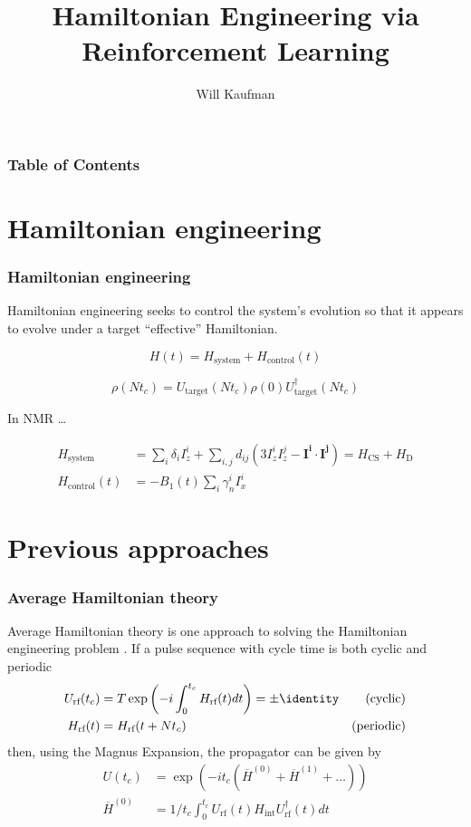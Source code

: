 \documentclass{beamer}
\title{Hamiltonian Engineering via Reinforcement Learning}
\author{Will Kaufman}
\institute{Ramanathan Group \\ Dartmouth College}
\begin{document}
\frame{\titlepage}

\begin{frame}
\frametitle{Table of Contents}
\tableofcontents
\end{frame}

\section{Hamiltonian engineering}

\begin{frame}
\frametitle{Hamiltonian engineering}

Hamiltonian engineering seeks to control the system's evolution so that it appears to evolve under a target ``effective'' Hamiltonian.

\begin{equation}
    H(t) = H_\text{system} + H_\text{control}(t)
\end{equation}

\begin{equation}\label{eq:strob_measure}
    \rho(Nt_c) = U_\text{target}(Nt_c) \rho(0) U_\text{target}^\dagger(Nt_c)
\end{equation}

\pause

In NMR \cite{1976ii}\dots

\begin{align}\label{eq:ham_spin}
    H_\text{system} &= \sum_i \delta_i I_z^i + \sum_{i,j} d_{ij} \left( 3I_z^iI_z^j - \mathbf{I^i} \cdot \mathbf{I^j} \right)
    = H_\text{CS} + H_\text{D} \\
    H_\text{control}(t) &= -B_1(t) \sum_i \gamma_n^i I_x^i
\end{align}

\end{frame}

\section{Previous approaches}

\begin{frame}
\frametitle{Average Hamiltonian theory}

Average Hamiltonian theory is one approach to solving the Hamiltonian engineering problem
\cite{PhysRev.175.453}.
If a pulse sequence with cycle time is both cyclic and periodic
\cite{gerstein-dybowski}
\begin{align}\label{eq:AHT_conditions}
    U_\text{rf}(t_c) &= T\exp \left(
        -i \int_0^{t_c} H_\text{rf}(t) dt \right) = \pm \identity
        & \text{(cyclic)} \\
    H_\text{rf}(t) &= H_\text{rf}(t + Nt_c) & \text{(periodic)}
\end{align}
then, using the Magnus Expansion, the propagator can be given by
\begin{align}\label{eq:AHT_average}
    U(t_c) &= \exp\left( -i t_c (\overline{H}^{(0)} +
        \overline{H}^{(1)} + \dots) \right) \\
    \overline{H}^{(0)} &= 1/t_c \int_0^{t_c}
        U_\text{rf}(t) H_\text{int} U_\text{rf}^\dagger(t) dt
\end{align}

\end{frame}
\end{document}

